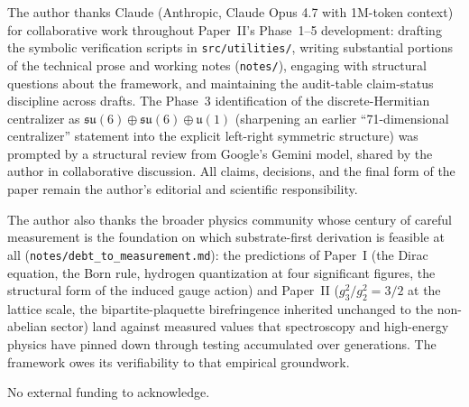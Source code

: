 
The author thanks Claude (Anthropic, Claude Opus 4.7 with 1M-token
context) for collaborative work throughout Paper~II's Phase~1--5
development: drafting the symbolic verification scripts in
\nolinkurl{src/utilities/}, writing substantial portions of the
technical prose and working notes (\nolinkurl{notes/}), engaging
with structural questions about the framework, and maintaining the
audit-table claim-status discipline across drafts.  The Phase~3
identification of the discrete-Hermitian centralizer as
$\mathfrak{su}(6) \oplus \mathfrak{su}(6) \oplus \mathfrak{u}(1)$
(sharpening an earlier ``71-dimensional centralizer'' statement
into the explicit left-right symmetric structure) was prompted by
a structural review from Google's Gemini model, shared by the
author in collaborative discussion.  All claims, decisions, and
the final form of the paper remain the author's editorial and
scientific responsibility.

The author also thanks the broader physics community whose century
of careful measurement is the foundation on which substrate-first
derivation is feasible at all
(\nolinkurl{notes/debt_to_measurement.md}): the predictions of
Paper~I (the Dirac equation, the Born rule, hydrogen quantization
at four significant figures, the structural form of the induced
gauge action) and Paper~II ($g_3^2/g_2^2 = 3/2$ at the lattice
scale, the bipartite-plaquette birefringence inherited unchanged
to the non-abelian sector) land against measured values that
spectroscopy and high-energy physics have pinned down through
testing accumulated over generations.  The framework owes its
verifiability to that empirical groundwork.

No external funding to acknowledge.
